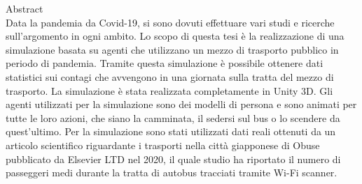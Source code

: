 \documentclass {article}
\begin{document}
	
	\preparefrontpagestandard
	\Large{Abstract\\ Data la pandemia da Covid-19, si sono dovuti effettuare vari studi e ricerche sull'argomento in ogni ambito. Lo scopo di questa tesi è la realizzazione di una simulazione basata su agenti che utilizzano un mezzo di trasporto pubblico in periodo di pandemia. Tramite questa simulazione è possibile ottenere dati statistici sui contagi che avvengono in una giornata sulla tratta del mezzo di trasporto. La simulazione è stata realizzata completamente in Unity 3D. Gli agenti utilizzati per la simulazione sono dei modelli di persona e sono animati per tutte le loro azioni, che siano la camminata, il sedersi sul bus o lo scendere da quest'ultimo. Per la simulazione sono stati utilizzati dati reali ottenuti da un articolo scientifico riguardante i trasporti nella città giapponese di Obuse pubblicato da Elsevier LTD nel 2020, il quale studio ha riportato il numero di passeggeri medi durante la tratta di autobus tracciati tramite Wi-Fi scanner.
}
	
\end{document}
